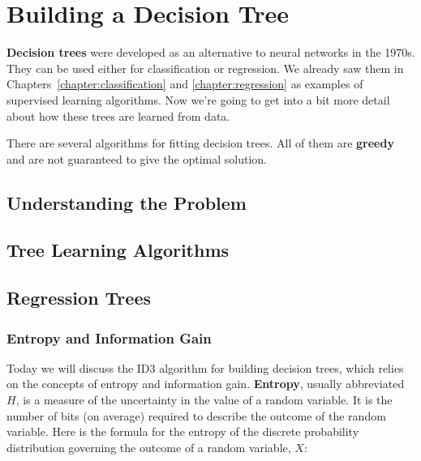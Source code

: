 \chapter{Building a Decision Tree \label{chapter:decisiontrees}}

{\bf Decision trees} were developed as an alternative to neural networks in the 1970s. They can be used either for classification or regression. We already saw them in Chapters~\ref{chapter:classification} and \ref{chapter:regression} as examples of supervised learning algorithms. Now we're going to get into a bit more detail about how these trees are learned from data. 

There are several algorithms for fitting decision trees. All of them are \textbf{greedy} and are not guaranteed to give the optimal solution.


\section{Understanding the Problem}


\section{Tree Learning Algorithms}

\section{Regression Trees}


\subsection{Entropy and Information Gain}

Today we will discuss the ID3 algorithm for building decision trees, which relies on the concepts of entropy and information gain. \textbf{Entropy}, usually abbreviated $H$, is a measure of the uncertainty in the value of a random variable. It is the number of bits (on average) required to describe the outcome of the random variable. Here is the formula for the entropy of the discrete probability distribution governing the outcome of a random variable, $X$:

